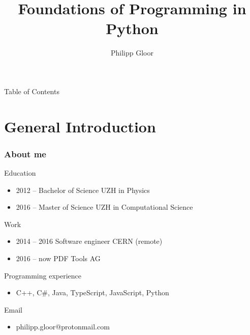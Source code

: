 \documentclass[10pt, a4paper]{beamer} %
\title %
{Foundations of Programming in Python}
\author %
{Philipp Gloor\inst{1}}
\institute
{
  \inst{1}%
  University of Zurich
}
\date{}
\begin{document}
\begin{frame}
\titlepage
\end{frame}

\begin{frame}{Table of Contents}
  \tableofcontents
\end{frame}
\section{General Introduction}
\begin{frame}
\frametitle{About me}

\begin{block}{Education}
  \begin{itemize}
    \item 2012 -- Bachelor of Science UZH in Physics
    \item 2016 -- Master of Science UZH in Computational Science
  \end{itemize}
\end{block}

\begin{block}{Work}
  \begin{itemize}
    \item 2014 -- 2016 Software engineer CERN (remote)
    \item 2016 -- now PDF Tools AG
  \end{itemize}
\end{block}

\begin{block}{Programming experience}
  \begin{itemize}
    \item[] C++, C\#, Java, TypeScript, JavaScript, Python
  \end{itemize}
\end{block}

\begin{block}{Email}
\begin{itemize}
    \item[] philipp.gloor@protonmail.com
\end{itemize}
  
\end{block}

 
 
 
\end{frame}
\end{document}
